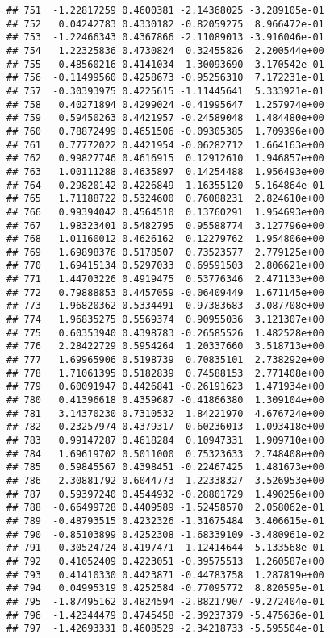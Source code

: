 \documentclass[
]{article}
\begin{document}
\begin{verbatim}
## 751  -1.22817259 0.4600381 -2.14368025 -3.289105e-01
## 752   0.04242783 0.4330182 -0.82059275  8.966472e-01
## 753  -1.22466343 0.4367866 -2.11089013 -3.916046e-01
## 754   1.22325836 0.4730824  0.32455826  2.200544e+00
## 755  -0.48560216 0.4141034 -1.30093690  3.170542e-01
## 756  -0.11499560 0.4258673 -0.95256310  7.172231e-01
## 757  -0.30393975 0.4225615 -1.11445641  5.333921e-01
## 758   0.40271894 0.4299024 -0.41995647  1.257974e+00
## 759   0.59450263 0.4421957 -0.24589048  1.484480e+00
## 760   0.78872499 0.4651506 -0.09305385  1.709396e+00
## 761   0.77772022 0.4421954 -0.06282712  1.664163e+00
## 762   0.99827746 0.4616915  0.12912610  1.946857e+00
## 763   1.00111288 0.4635897  0.14254488  1.956493e+00
## 764  -0.29820142 0.4226849 -1.16355120  5.164864e-01
## 765   1.71188722 0.5324600  0.76088231  2.824610e+00
## 766   0.99394042 0.4564510  0.13760291  1.954693e+00
## 767   1.98323401 0.5482795  0.95588774  3.127796e+00
## 768   1.01160012 0.4626162  0.12279762  1.954806e+00
## 769   1.69898376 0.5178507  0.73523577  2.779125e+00
## 770   1.69415134 0.5297033  0.69591503  2.806621e+00
## 771   1.44703226 0.4919475  0.53776346  2.471133e+00
## 772   0.79888853 0.4457059 -0.06409449  1.671145e+00
## 773   1.96820362 0.5334491  0.97383683  3.087708e+00
## 774   1.96835275 0.5569374  0.90955036  3.121307e+00
## 775   0.60353940 0.4398783 -0.26585526  1.482528e+00
## 776   2.28422729 0.5954264  1.20337660  3.518713e+00
## 777   1.69965906 0.5198739  0.70835101  2.738292e+00
## 778   1.71061395 0.5182839  0.74588153  2.771408e+00
## 779   0.60091947 0.4426841 -0.26191623  1.471934e+00
## 780   0.41396618 0.4359687 -0.41866380  1.309104e+00
## 781   3.14370230 0.7310532  1.84221970  4.676724e+00
## 782   0.23257974 0.4379317 -0.60236013  1.093418e+00
## 783   0.99147287 0.4618284  0.10947331  1.909710e+00
## 784   1.69619702 0.5011000  0.75323633  2.748408e+00
## 785   0.59845567 0.4398451 -0.22467425  1.481673e+00
## 786   2.30881792 0.6044773  1.22338327  3.526953e+00
## 787   0.59397240 0.4544932 -0.28801729  1.490256e+00
## 788  -0.66499728 0.4409589 -1.52458570  2.058062e-01
## 789  -0.48793515 0.4232326 -1.31675484  3.406615e-01
## 790  -0.85103899 0.4252308 -1.68339109 -3.480961e-02
## 791  -0.30524724 0.4197471 -1.12414644  5.133568e-01
## 792   0.41052409 0.4223051 -0.39575513  1.260587e+00
## 793   0.41410330 0.4423871 -0.44783758  1.287819e+00
## 794   0.04995319 0.4252584 -0.77095772  8.820595e-01
## 795  -1.87495162 0.4824594 -2.88217907 -9.272404e-01
## 796  -1.42344479 0.4745458 -2.39237379 -5.475636e-01
## 797  -1.42693331 0.4608529 -2.34218733 -5.595504e-01

\end{verbatim}
\end{document}
